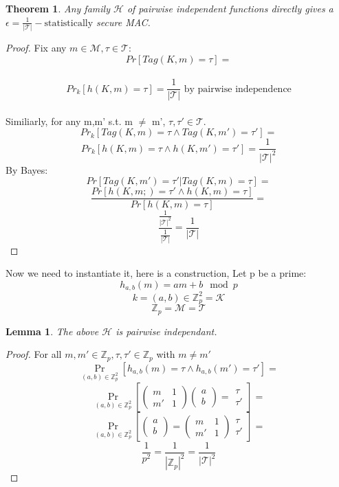 \documentclass[11pt, a4paper]{article}
\newcommand{\Z}{\mathbb{Z}}
\newtheorem{thm}{Theorem}
\newtheorem{lem}{Lemma}
\begin{document}
\begin{thm}
    Any family $\mathcal{H}$ of pairwise independent functions directly gives a $\epsilon = \frac{1}{|\mathcal{T}|}-\text{statistically}$ secure MAC.
\end{thm}
\begin{proof}
    Fix any $m \in \mathcal{M}, \tau \in \mathcal{T}$:\\
    $$Pr[Tag(K,m) = \tau] =$$ \\$$ Pr_k[h(K,m)= \tau] = \frac{1}{|\mathcal{T}|}\text{ by pairwise independence}$$\\
    Similiarly, for any m,m' s.t. m $\neq$ m', $\tau,\tau' \in \mathcal{T}$.
    $$Pr_k[Tag(K,m)= \tau \wedge Tag(K,m') = \tau'] =$$
    $$Pr_k[h(K,m)=\tau \wedge h(K,m')= \tau'] = \frac{1}{|\mathcal{T}|^2}$$
    By Bayes:
    $$Pr[Tag(K,m')= \tau' | Tag(K,m) = \tau] = $$
    $$\frac{Pr[h(K,m;) = \tau' \wedge h(K,m) = \tau]}{Pr[h(K,m) = \tau]} =$$
    $$\frac{\frac{1}{|\mathcal{T}|^2}}{\frac{1}{|\mathcal{T}|}} = \frac{1}{|\mathcal{T}|}$$

\end{proof}
Now we need to instantiate it, here is a construction, Let p be a prime:\\
    $$h_{a,b}(m) = am+b \mod p $$
    $$k = (a,b) \in \Z_{p}^2 = \mathcal{K}$$
    $$\Z_p = \mathcal{M} =\mathcal{T}$$
\begin{lem}
    The above $\mathcal{H}$ is \textit{pairwise independant}.
\end{lem}
\begin{proof}
    For all $m,m' \in \Z_p , \tau,\tau' \in \Z_p$ with $m \neq m'$\\
    $$\Pr_{(a,b) \in \Z_{p}^2}[h_{a,b}(m) = \tau \wedge h_{a,b}(m') = \tau'] =$$
    $$\Pr_{(a,b) \in \Z_{p}^2}\left[
        \begin{pmatrix}
        m & 1 \\ m' & 1
        \end{pmatrix}
        \begin{pmatrix}
            a \\ b
        \end{pmatrix} =
        \begin{matrix}
            \tau \\ \tau'
        \end{matrix}\right] = $$ 
        $$\Pr_{(a,b) \in \Z_{p}^2}\left[
        \begin{pmatrix}
            a \\ b
        \end{pmatrix} =
        \begin{pmatrix}
        m & 1 \\ m' & 1
        \end{pmatrix}
        \begin{matrix}
            \tau \\ \tau'
        \end{matrix}\right] = $$
        $$\frac{1}{p^2} = \frac{1}{|\Z_{p}|^2} = \frac{1}{|\mathcal{T}|^2}$$
\end{proof}
\end{document}
